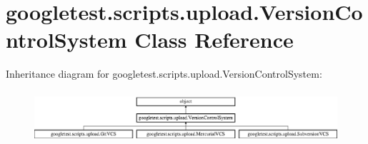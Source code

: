 \hypertarget{classgoogletest_1_1scripts_1_1upload_1_1_version_control_system}{}\section{googletest.\+scripts.\+upload.\+Version\+Control\+System Class Reference}
\label{classgoogletest_1_1scripts_1_1upload_1_1_version_control_system}
Inheritance diagram for googletest.\+scripts.\+upload.\+Version\+Control\+System\+:\begin{figure}[H]
\begin{center}
\leavevmode
\includegraphics[height=1.937716cm]{d2/d1e/classgoogletest_1_1scripts_1_1upload_1_1_version_control_system}
\end{center}
\end{figure}
